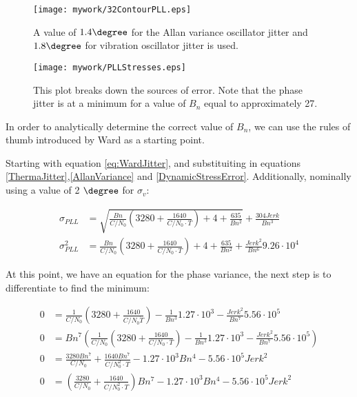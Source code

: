 \begin{figure}[!htb] 
    \centering
    \texttt{[image: mywork/32ContourPLL.eps]} 
    \caption{A value of $1.4\degree$ for the Allan variance oscillator jitter and $1.8\degree$ for vibration oscillator jitter is used.}
\end{figure}


\begin{figure}[!htb] 
    \centering
    \texttt{[image: mywork/PLLStresses.eps]} 
    \caption{This plot breaks down the sources of error. Note that the phase jitter is at a minimum for a value of $B_n$ equal to approximately 27.}
\end{figure}

In order to analytically determine the correct value of $B_n$, we can use the rules of thumb introduced by Ward as a starting point\cite{Ward}.

Starting with equation \ref{eq:WardJitter}, and substituiting in equations \ref{ThermaJitter},\ref{AllanVariance} and \ref{DynamicStressError}.
Additionally, nominally using a value of 2 $\degree$ for $\sigma_v$:

\begin{align*}
\sigma_{PLL} &= \sqrt{\frac{Bn}{C/N_0} \left(3280 + \frac{1640}{C/N_0 \cdot T}\right) + 4 + \frac{635}{Bn^{2}}} + \frac{304 Jerk}{Bn^{3}}\\
\sigma_{PLL}^2 &= \frac{Bn}{C/N_0} \left(3280 + \frac{1640}{C/N_0 \cdot T}\right) + 4 + \frac{635}{Bn^{2}} + \frac{Jerk^{2}}{Bn^{6}} 9.26 \cdot 10^{4}
\end{align*}

At this point, we have an equation for the phase variance, the next step is to differentiate to find the minimum:

\begin{align*}
0&=\frac{1}{C/N_0} \left(3280 + \frac{1640}{C/N_0 \dot T}\right) - \frac{1}{Bn^{3}} 1.27 \cdot 10^{3} - \frac{Jerk^{2}}{Bn^{7}} 5.56 \cdot 10^{5}\\
0&=Bn^{7} \left(\frac{1}{C/N_0} \left(3280 + \frac{1640}{C/N_0 \cdot T}\right) - \frac{1}{Bn^{3}} 1.27 \cdot 10^{3} - \frac{Jerk^{2}}{Bn^{7}} 5.56 \cdot 10^{5}\right)\\
0&=\frac{3280 Bn^{7}}{C/N_0} + \frac{1640 Bn^{7}}{C/N_0^{2} \cdot T} - 1.27 \cdot 10^{3} Bn^{4} - 5.56 \cdot 10^{5} Jerk^{2}\\
0&=(\frac{3280}{C/N_0} + \frac{1640}{C/N_0^{2} \cdot T})Bn^{7}  - 1.27 \cdot 10^{3} Bn^{4} - 5.56 \cdot 10^{5} Jerk^{2}
\end{align*}


